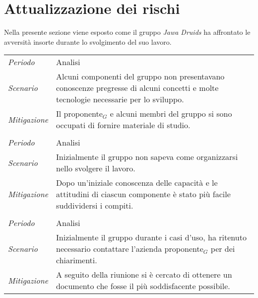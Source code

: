 \chapter{Attualizzazione dei rischi}\label{AttualizzazioneDeiRischi}
Nella presente sezione viene esposto come il gruppo \textit{Jawa Druids} ha affrontato le avversità insorte durante lo svolgimento del suo lavoro.

\def\tabularxcolumn#1{m{#1}}
{
	
	\begin{center}
		\renewcommand{\arraystretch}{1.4}
		\begin{longtable}{|p{5cm}|p{12cm}|}
			\hline
			\rowcolor{airforceblue}
			\multicolumn{2}{|c|}{\textit{RT1- Inesperienza tecnologica}}\\
			\hline
			\textit{Periodo} & Analisi \\
			\hline
			\textit{Scenario} & Alcuni componenti del gruppo non presentavano conoscenze pregresse di alcuni concetti e molte tecnologie necessarie per lo sviluppo. \\
			\hline
			\textit{Mitigazione} & Il proponente$_G$ e alcuni membri del gruppo si sono occupati di fornire materiale di studio. \\
			\hline
			\rowcolor{airforceblue}
			\multicolumn{2}{|c|}{\textit{RO4- Inesperienza nel coordinamento}}\\
			\hline
			\textit{Periodo} & Analisi \\
			\hline
			\textit{Scenario} & Inizialmente il gruppo non sapeva come organizzarsi nello svolgere il lavoro. \\
			\hline
			\textit{Mitigazione} & Dopo un'iniziale conoscenza delle capacità e le attitudini di ciascun componente è stato più facile suddividersi i compiti. \\
				\hline
			\rowcolor{airforceblue}
			\multicolumn{2}{|c|}{\textit{RO7- Analisi dei requisiti imperfetta}}\\
			\hline
			\textit{Periodo} & Analisi \\
			\hline
			\textit{Scenario} & Inizialmente il gruppo durante i casi d'uso, ha ritenuto necessario contattare l'azienda proponente$_G$ per dei chiarimenti. \\
			\hline
			\textit{Mitigazione} & A seguito della riunione si è cercato di ottenere un documento che fosse il più soddisfacente possibile. \\
		\end{longtable}
	\end{center}

}
